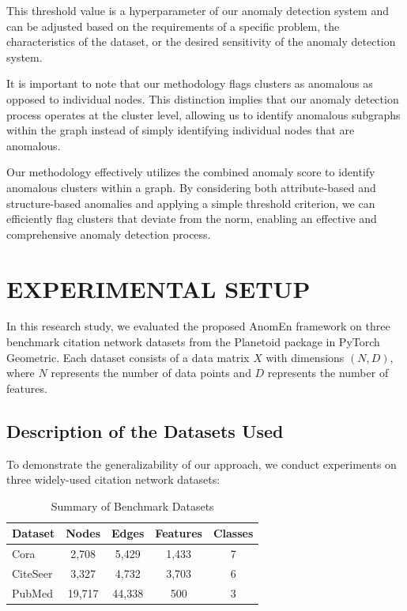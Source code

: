 \documentclass[10pt,twocolumn,a4paper]{article}
\begin{document}
This threshold value is a hyperparameter of our anomaly detection system and can be adjusted based on the requirements of a specific problem, the characteristics of the dataset, or the desired sensitivity of the anomaly detection system.

It is important to note that our methodology flags clusters as anomalous as opposed to individual nodes. This distinction implies that our anomaly detection process operates at the cluster level, allowing us to identify anomalous subgraphs within the graph instead of simply identifying individual nodes that are anomalous.

Our methodology effectively utilizes the combined anomaly score to identify anomalous clusters within a graph. By considering both attribute-based and structure-based anomalies and applying a simple threshold criterion, we can efficiently flag clusters that deviate from the norm, enabling an effective and comprehensive anomaly detection process.



\section{EXPERIMENTAL SETUP}
In this research study, we evaluated the proposed AnomEn framework on three benchmark citation network datasets from the Planetoid package in PyTorch Geometric. Each dataset consists of a data matrix $X$ with dimensions $(N, D)$, where $N$ represents the number of data points and $D$ represents the number of features.

\subsection{Description of the Datasets Used}

To demonstrate the generalizability of our approach, we conduct experiments on three widely-used citation network datasets:

\begin{table}[ht]
\centering
\caption{Summary of Benchmark Datasets}
\label{tab:datasets}
\begin{tabular}{|l|c|c|c|c|}
\hline
\textbf{Dataset} & \textbf{Nodes} & \textbf{Edges} & \textbf{Features} & \textbf{Classes} \\
\hline
Cora & 2,708 & 5,429 & 1,433 & 7 \\
\hline
CiteSeer & 3,327 & 4,732 & 3,703 & 6 \\
\hline
PubMed & 19,717 & 44,338 & 500 & 3 \\
\hline
\end{tabular}
\end{table}
\end{document}

